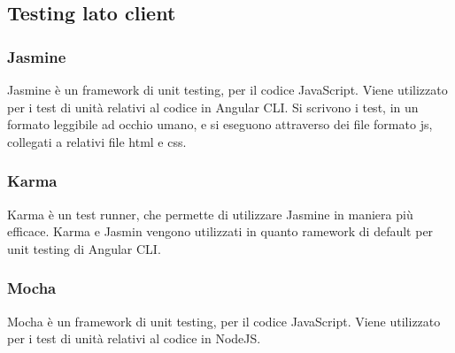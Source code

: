 \subsection{Testing lato client}

\subsubsection{Jasmine}
Jasmine è un framework di unit testing, per il codice JavaScript.
Viene utilizzato per i test di unità relativi al codice in Angular CLI.
Si scrivono i test, in un formato leggibile ad occhio umano, e si eseguono attraverso dei file formato js, collegati a relativi file html e css.

\subsubsection{Karma}
Karma è un test runner, che permette di utilizzare Jasmine in maniera più efficace.
Karma e Jasmin vengono utilizzati in quanto ramework di default per unit testing di Angular CLI.

\subsubsection{Mocha}
Mocha è un framework di unit testing, per il codice JavaScript.
Viene utilizzato per i test di unità relativi al codice in NodeJS.